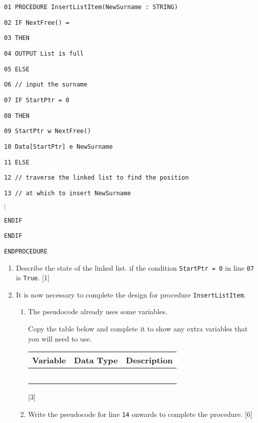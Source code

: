 \noindent %
\noindent\begin{minipage}[t]{1\columnwidth}%
\texttt{01 PROCEDURE InsertListItem(NewSurname : STRING) }

\texttt{02 \qquad{}IF NextFree() =  }

\texttt{03 \qquad{}\qquad{}THEN }

\texttt{04 \qquad{}\qquad{}\qquad{}OUTPUT \textquotedbl List is
full\textquotedbl{} }

\texttt{05 \qquad{}\qquad{}ELSE }

\texttt{O6 \qquad{}\qquad{}\qquad{}// input the surname }

\texttt{07 \qquad{}\qquad{}\qquad{}IF StartPtr = 0 }

\texttt{08 \qquad{}\qquad{}\qquad{}\qquad{}THEN }

\texttt{09 \qquad{}\qquad{}\qquad{}\qquad{}\qquad{}StartPtr w
NextFree() }

\texttt{10 \qquad{}\qquad{}\qquad{}\qquad{}\qquad{}Data{[}StartPtr{]}
e NewSurname }

\texttt{11 \qquad{}\qquad{}\qquad{}\qquad{}ELSE }

\texttt{12 \qquad{}\qquad{}\qquad{}\qquad{}\qquad{}// traverse
the linked list to find the position }

\texttt{13 \qquad{}\qquad{}\qquad{}\qquad{}\qquad{}// at which
to insert NewSurname}

$\vdots$

\texttt{\qquad{}\qquad{}\qquad{}\qquad{}ENDIF }

\texttt{\qquad{}\qquad{}ENDIF }

\texttt{\qquad{}ENDPROCEDURE}%
\end{minipage}
\begin{enumerate}
\item Describe the state of the linked list. if the condition \texttt{StartPtr
= 0} in line \texttt{07} is \texttt{True}. {[}1{]} 
\item It is now necessary to complete the design for procedure \texttt{InsertListItem}. 
\begin{enumerate}
\item The pseudocode already uses some variables. 

Copy the table below and complete it to show any extra variables that
you will need to use. 
\begin{center}
\begin{tabular}{|c|c|c|}
\hline 
\textbf{Variable} & \textbf{Data Type} & \textbf{Description}\tabularnewline
\hline 
 &  & \tabularnewline
\hline 
 &  & \tabularnewline
\hline 
 &  & \tabularnewline
\hline 
 &  & \tabularnewline
\hline 
 &  & \tabularnewline
\hline 
\end{tabular}
\par\end{center}

\hfill{}{[}3{]}
\item Write the pseudocode for line \texttt{14} onwards to complete the
procedure. \hfill{}{[}6{]}
\end{enumerate}
\end{enumerate}